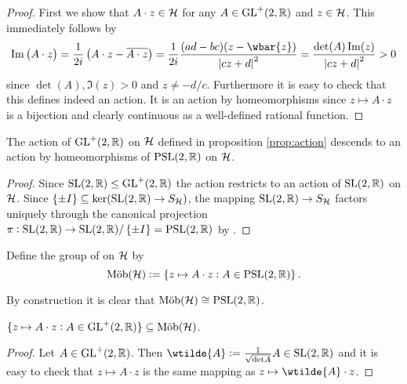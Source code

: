 \begin{proof}
	First we show that $A \cdot z \in \mathcal{H}$ for any $A \in \mathrm{GL}^+(2,\mathbb{R})$ and $z \in \mathcal{H}$. This immediately follows by
	\begin{equation}
\Im\del[1]{A \cdot z} = \frac{1}{2i}\del[1]{A \cdot z - \overline{A \cdot z}} = \frac{1}{2i}\frac{(ad - bc)(z - \wbar{z})}{\abs[0]{cz + d}^2} = \frac{\det(A)\Im(z)}{\abs[0]{cz + d}^2} > 0
		\label{eq:imaginary_part}
	\end{equation}
	\noindent since $\det(A),\Im(z) > 0$ and $z \neq -d/c$. Furthermore it is easy to check that this defines indeed an action. It is an action by homeomorphisms since $z \mapsto A \cdot z$ is a bijection and clearly continuous as a well-defined rational function. 
\end{proof}

\begin{corollary}
	The action of $\mathrm{GL}^+(2,\mathbb{R})$ on $\mathcal{H}$ defined in proposition \ref{prop:action} descends to an action by homeomorphisms of $\mathrm{PSL}(2,\mathbb{R})$ on $\mathcal{H}$.
\end{corollary}

\begin{proof}
	Since $\mathrm{SL}(2,\mathbb{R}) \leq \mathrm{GL}^+(2,\mathbb{R})$ the action restricts to an action of $\mathrm{SL}(2,\mathbb{R})$ on $\mathcal{H}$. Since $\cbr[0]{\pm I} \subseteq \ker(\SLrm(2,\Rbb) \to S_\Hcal)$, the mapping $\mathrm{SL}(2,\mathbb{R}) \to S_{\mathcal{H}}$ factors uniquely through the canonical projection $\pi : \SLrm(2,\Rbb) \to \SLrm(2,\Rbb)/\cbr[0]{\pm I} = \PSLrm(2,\Rbb)$ by \cite[23]{grillet:abstract_algebra:2007}.	
\end{proof}

\begin{definition}
	Define the group of  on $\mathcal{H}$ by
	\begin{equation}
		\Mob(\Hcal) := \cbr[0]{z \mapsto A \cdot z : A \in \PSLrm(2,\Rbb)}.
	\end{equation}
\end{definition}

\begin{remark}
	By construction it is clear that $\mathrm{M\ddot{o}b}(\mathcal{H}) \cong \mathrm{PSL}(2,\mathbb{R})$.
\end{remark}

\begin{proposition}
	$\cbr[0]{z \mapsto A \cdot z : A \in \GLrm^+(2,\Rbb)} \subseteq \Mob(\Hcal)$.
\end{proposition}

\begin{proof}
	Let $A \in \mathrm{GL}^+(2,\mathbb{R})$. Then $\wtilde{A} := \frac{1}{\sqrt{\det A}}A \in \SLrm(2,\Rbb)$ and it is easy to check that $z \mapsto A \cdot z$ is the same mapping as $z \mapsto \wtilde{A} \cdot z$.
\end{proof}

